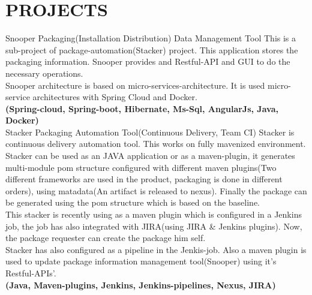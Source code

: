 \documentclass[]{cv-class}
\begin{document}
\section{PROJECTS}
\begin{entrylist}
\entry
    {}
	{Snooper}    
    {Packaging(Installation Distribution) Data Management Tool}
{This is a sub-project of package-automation(Stacker) project. This application stores the packaging information. Snooper provides and Restful-API and GUI to do the necessary operations.\\Snooper architecture is based on micro-services-architecture. It is used micro-service architectures with Spring Cloud and Docker.\\\textbf{(Spring-cloud, Spring-boot, Hibernate, Ms-Sql, AngularJs, Java, Docker)}}
\\
\entry
    {}
	{Stacker}    
    {Packaging Automation Tool(Continuous Delivery, Team CI)}
    {Stacker is continuous delivery automation tool. This works on fully mavenized environment. Stacker can be used as an JAVA application or as a maven-plugin, it generates multi-module pom structure configured with different maven plugins(Two 			different frameworks are used in the product, packaging is done in different orders), using matadata(An artifact is released to nexus). Finally the package can be generated using the pom structure which is based on the baseline. \\This stacker is recently using as a maven plugin which is configured in a Jenkins job, the job has also integrated with JIRA(using JIRA \& Jenkins plugins). Now, the package requester can create the package him self. \\Stacker has also configured as a pipeline in the Jenkis-job. Also a maven plugin is used to update package information management tool(Snooper) using it's Restful-APIs'.\\\textbf{(Java, Maven-plugins, Jenkins, Jenkins-pipelines, Nexus, JIRA)}}
\end{entrylist}


\newpage
\begin{aside}
\end{aside}
\end{document}
